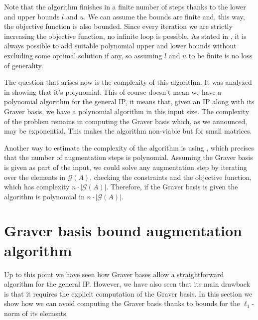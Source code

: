 Note that the algorithm finishes in a finite number of steps thanks to the lower and upper bounds $l$ and $u$. We can assume the bounds are finite and, this way, the objective function is also bounded. Since every iteration we are strictly increasing the objective function, no infinite loop is possible. As stated in \cite{HEMMECKE:2011}, it is always possible to add suitable polynomial upper and lower bounds without excluding some optimal solution if any, so assuming $l$ and $u$ to be finite is no loss of generality.

The question that arises now is the complexity of this algorithm. It was analyzed in \cite[Theorem 3.3]{LHOW:2006} showing that it's polynomial. This of course doesn't mean we have a polynomial algorithm for the general IP, it means that, given an IP along with its Graver basis, we have a polynomial algorithm in this input size. The complexity of the problem remains in computing the Graver basis which, as we announced, may be exponential. This makes the algorithm non-viable but for small matrices. 


Another way to estimate the complexity of the algorithm is using \cite[Theorem 2.b]{HOW:2009}, which precises that the number of augmentation steps is polynomial. Assuming the Graver basis is given as part of the input, we could solve any augmentation step by iterating over the elements in $\mathcal{G}(A)$, checking the constraints and the objective function, which has complexity $n \cdot |\mathcal{G}(A)|$. Therefore, if the Graver basis is given the algorithm is polynomial in $n \cdot |\mathcal{G}(A)|$.


\section{Graver basis bound augmentation algorithm}

Up to this point we have seen how Graver bases allow a straightforward algorithm for the general IP. However, we have also seen that its main drawback is that it requires the explicit computation of the Graver basis. In this section we show how we can avoid computing the Graver basis thanks to bounds for the $\ell_1$-norm of its elements.

